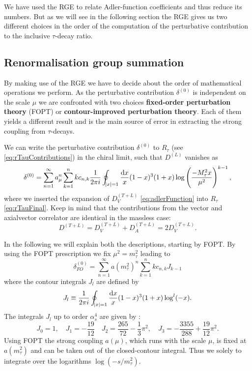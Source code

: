 \documentclass[../../index.tex]{subfiles}
\begin{document}
We have used the RGE to relate Adler-function coefficients and thus reduce its
numbers. But as we will see in the following section the RGE gives us two
different choices in the order of the computation of the perturbative
contribution to the inclusive $\tau$-decay ratio.

\subsection{Renormalisation group summation}
By making use of the RGE we have to decide about the order of mathematical
operations we perform. As the perturbative contribution $\delta^{(0)}$ is
independent on the scale $\mu$ we are confronted with two choices
\textbf{fixed-order perturbation theory} (FOPT) or \textbf{contour-improved
  perturbation theory}. Each of them yields a different result and is the main
source of error in extracting the strong coupling from $\tau$-decays.

We can write the perturbative contribution $\delta^{(0)}$ to $R_\tau$ (see
\cref{eq:rTauContributions}) in the chiral limit, such that $D^{(L)}$ vanishes as
\begin{equation}
  \label{eq:rTauDelta0}
  \delta^{(0)} = \sum_{n=1}^{\infty} a_\mu^n \sum_{k=1}^n k c_{n,k} \frac{1}{2 \pi i} \oint_{\abs{x}=1} \frac{\dif x}{x} (1-x)^3(1+x) \log \left( \frac{-M_\tau^2 x}{\mu^2} \right)^{k-1},
\end{equation}
where we inserted the expansion of $D_V^{(T+L)}$ \cref{eq:adlerFunction} into
$R_\tau$ \cref{eq:rTauFinal}. Keep in mind that the contributions from the
vector and axialvector correlator are identical in the massless case:
\begin{equation}
  D^{(T+L)} = D^{(T+L)}_V + D^{(T+L)}_A = 2 D^{(T+L)}_V.
\end{equation}

In the following we will explain both the descriptions, starting by FOPT. By
using the FOPT prescription we fix $\mu^2=m_\tau^2$ leading to
\begin{equation}
  \delta_{FO}^{(0)} = \sum_{n=1}^\infty a(m_\tau^2)^n \sum_{k=1}^n k c_{n,k} J_{k-1}
\end{equation}
where the contour integrals $J_l$ are defined by
\begin{equation}
  J_l \equiv \frac{1}{2\pi i} \oint_{\abs{x}=1} \frac{\dif x}{x} (1-x)^3(1+x) \log^l(-x).
\end{equation}
The integrals $J_l$ up to order $\alpha_s^4$ are given by \cite{Beneke2008}:
\begin{equation}
  J_0 = 1, \quad J_1 = -\frac{19}{12} \quad J_2 = \frac{265}{72} - \frac{1}{3} \pi^2, \quad J_3 = - \frac{3355}{288} + \frac{19}{12}\pi^2.
\end{equation}
Using FOPT the strong coupling $a(\mu)$, which runs with the scale $\mu$, is
fixed at $a(m_\tau^2)$ and can be taken out of the closed-contour integral. Thus
we solely to integrate over the logarithms $\log(-s/m_\tau^2)$.  
\end{document}
